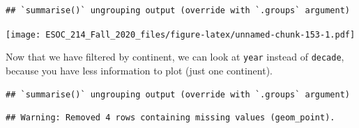 \documentclass[
]{book}
\newenvironment{Shaded}{\begin{snugshade}}{\end{snugshade}}
\newcommand{\DataTypeTok}[1]{\textcolor[rgb]{0.13,0.29,0.53}{#1}}
\newcommand{\KeywordTok}[1]{\textcolor[rgb]{0.13,0.29,0.53}{\textbf{#1}}}
\newcommand{\NormalTok}[1]{#1}
\newcommand{\OperatorTok}[1]{\textcolor[rgb]{0.81,0.36,0.00}{\textbf{#1}}}
\newcommand{\OtherTok}[1]{\textcolor[rgb]{0.56,0.35,0.01}{#1}}
\newcommand{\StringTok}[1]{\textcolor[rgb]{0.31,0.60,0.02}{#1}}
\begin{document}
\begin{Shaded}
\end{Shaded}

\begin{verbatim}
## `summarise()` ungrouping output (override with `.groups` argument)
\end{verbatim}

\texttt{[image: ESOC\_214\_Fall\_2020\_files/figure-latex/unnamed-chunk-153-1.pdf]}

Now that we have filtered by continent, we can look at \texttt{year} instead of \texttt{decade}, because you have less information to plot (just one continent).

\begin{Shaded}
\end{Shaded}

\begin{verbatim}
## `summarise()` ungrouping output (override with `.groups` argument)
\end{verbatim}

\begin{verbatim}
## Warning: Removed 4 rows containing missing values (geom_point).
\end{verbatim}
\end{document}

